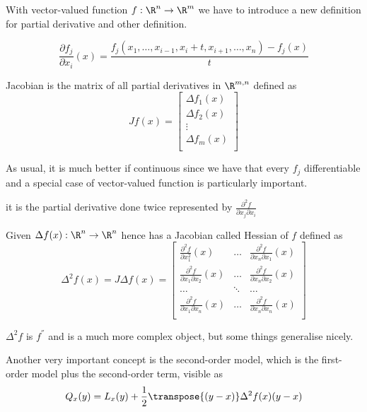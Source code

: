 With vector-valued function $f:\R^n \to \R^m$ we have to introduce a new definition for 
partial derivative and other definition.\newline
\begin{defi}
	\[ \frac{\partial f_j}{\partial x_i}(x) = 
	       \frac{f_j(x_1, \dots, x_{i-1}, x_i + t, x_{i+1}, \dots, x_n) - f_j(x)}{t} \]
\end{defi}
\begin{defi}[Jacobian]
	Jacobian is the matrix of all partial derivatives in $\R^{m, n}$ defined as 
	\[ Jf(x) = \begin{bmatrix}
		\Delta f_1(x) \\
		\Delta f_2(x) \\
		\vdots \\
		\Delta f_m(x) \\
		    \end{bmatrix} \]
\end{defi}
As usual, it is much better if continuous since we have that every $f_j$ differentiable and a 
special case of vector-valued function is particularly important.
\begin{defi}
	it is the partial derivative done twice represented by 
	$\frac{\partial^2 f}{\partial x_j \partial x_i}$
\end{defi}
\begin{defi}[Hessian]
	Given $\Delta f(x): \R^n \to \R^n$ hence has a Jacobian called Hessian of $f$ defined as 
	\[ \Delta^2 f(x) = J \Delta f(x) = \begin{bmatrix}
		\frac{\partial^2 f}{\partial x_1^2}(x) & \dots & \frac{\partial^2 f}{\partial x_n \partial x_1}(x) \\
		\frac{\partial^2 f}{\partial x_1 \partial x_2}(x) & \dots & \frac{\partial^2 f}{\partial x_n \partial x_2}(x) \\
		\dots & \ddots & \dots \\
		\frac{\partial^2 f}{\partial x_1 \partial x_n}(x) & \dots & \frac{\partial^2 f}{\partial x_n \partial x_n}(x) \\
					   \end{bmatrix} \]
\end{defi}
$\Delta^2 f$ is $f^{''}$ and is a much more complex object, but some things generalise nicely.

Another very important concept is the second-order model, which is the first-order model plus
the second-order term, visible as
\[ Q_x(y) = L_x(y) + \frac{1}{2}\transpose{(y - x)}\Delta^2 f(x)(y - x) \]

